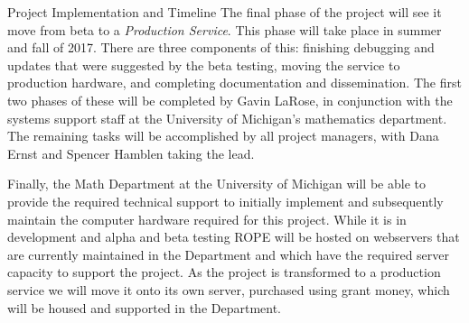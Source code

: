 \documentclass[11pt]{article}
\begin{document}
\begin{section}{Project Implementation and Timeline}
The final phase of the project will see it move from beta to a
\emph{Production Service}.  This phase will take place in summer and fall
of 2017.  There are three components of this: finishing debugging and
updates that were suggested by the beta testing, moving the service to
production hardware, and completing documentation and dissemination.  The
first two phases of these will be completed by Gavin LaRose, in
conjunction with the systems support staff at the University of Michigan's
mathematics department.  The remaining tasks will be accomplished by all
project managers, with Dana Ernst and Spencer Hamblen taking the lead.

Finally, the Math Department at the University of Michigan will be able to
provide the required technical support to initially implement and
subsequently maintain the computer hardware required for this project.
While it is in development and alpha and beta testing ROPE will be
hosted on webservers that are currently maintained in the Department and
which have the required server capacity to support the project.  As the
project is transformed to a production service we will move it onto its
own server, purchased using grant money, which will be housed and
supported in the Department.

\end{section}
\end{document}
